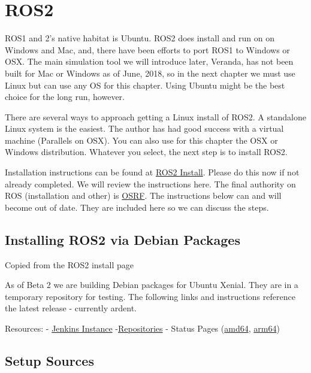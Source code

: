 \hypertarget{ros2}{%
\section{ROS2}\label{ros2}}

ROS1 and 2's native habitat is Ubuntu. ROS2 does install and run on on
Windows and Mac, and, there have been efforts to port ROS1 to Windows or
OSX. The main simulation tool we will introduce later, Veranda, has not
been built for Mac or Windows as of June, 2018, so in the next chapter
we must use Linux but can use any OS for this chapter. Using Ubuntu
might be the best choice for the long run, however.

There are several ways to approach getting a Linux install of ROS2. A
standalone Linux system is the easiest. The author has had good success
with a virtual machine (Parallels on OSX). You can also use for this
chapter the OSX or Windows distribution. Whatever you select, the next
step is to install ROS2.

Installation instructions can be found at
\href{https://github.com/ros2/ros2/wiki/Installation}{ROS2 Install}.
Please do this now if not already completed. We will review the
instructions here. The final authority on ROS (installation and other)
is \href{ros.org}{OSRF}. The instructions below can and will become out
of date. They are included here so we can discuss the steps.

\hypertarget{installing-ros2-via-debian-packages}{%
\subsection{Installing ROS2 via Debian
Packages}\label{installing-ros2-via-debian-packages}}

{Copied from the ROS2 install page}

As of Beta 2 we are building Debian packages for Ubuntu Xenial. They are
in a temporary repository for testing. The following links and
instructions reference the latest release - currently ardent.

Resources: - \href{http://build.ros2.org/}{Jenkins Instance}
-\href{http://repo.ros2.org}{Repositories} - Status Pages
(\href{http://repo.ros2.org/status_page/ros_ardent_default.html}{amd64},
\href{http://repo.ros2.org/status_page/ros_ardent_uxv8.html}{arm64})

\hypertarget{setup-sources}{%
\subsection{Setup Sources}\label{setup-sources}}

